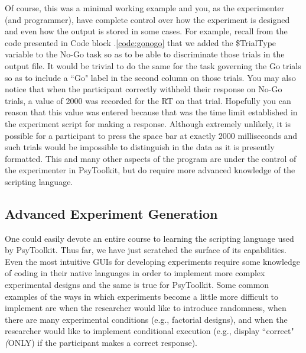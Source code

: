 Of course, this was a minimal working example and you, as the experimenter (and programmer), have complete control over how the experiment is designed and even how the output is stored in some cases.  For example, recall from the code presented in Code block \thechapter.\ref{code:gonogo} that we added the \$TrialType variable to the No-Go task so as to be able to discriminate those trials in the output file.  It would be trivial to do the same for the task governing the Go trials so as to include a ``Go" label in the second column on those trials. You may also notice that when the participant correctly withheld their response on No-Go trials, a value of 2000 was recorded for the RT on that trial.  Hopefully you can reason that this value was entered because that was the time limit established in the experiment script for making a response. Although extremely unlikely, \clearpage \noindent it is possible for a participant to press the space bar at exactly 2000 milliseconds and such trials would be impossible to distinguish in the data as it is presently formatted.  This and many other aspects of the program are under the control of the experimenter in PsyToolkit, but do require more advanced knowledge of the scripting language.  

\subsection{Advanced Experiment Generation}
One could easily devote an entire course to learning the scripting language used by PsyToolkit.  Thus far, we have just scratched the surface of its capabilities.  Even the most intuitive GUIs for developing experiments require some knowledge of coding in their native languages in order to implement more complex experimental designs and the same is true for PsyToolkit.  Some common examples of the ways in which experiments become a little more difficult to implement are when the researcher would like to introduce randomness, when there are many experimental conditions (e.g., factorial designs), and when the researcher would like to implement conditional execution (e.g., display ``correct" \emph(ONLY) if the participant makes a correct response).

